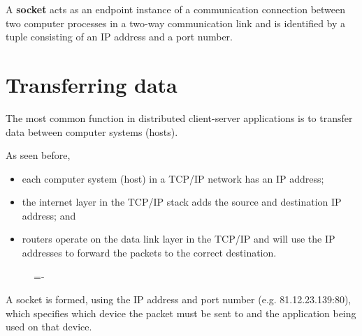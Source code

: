 \documentclass[a4paper]{systems-software}
\begin{document}
A \textbf{socket} acts as an endpoint instance of a communication connection between two computer processes in a two-way communication link and is identified by a tuple consisting of an IP address and a port number.


\section*{Transferring data}

The most common function in distributed client-server applications is to transfer data between computer systems (hosts).

As seen before,
\begin{itemize}
	\item each computer system (host) in a TCP/IP network has an IP address;
	\item the internet layer in the TCP/IP stack adds the source and destination IP address; and
	\item routers operate on the data link layer in the TCP/IP and will use the IP addresses to forward the packets to the correct destination.
\end{itemize}

\begin{figure}[H]
	\lineskip=-\fboxrule
\end{figure}

A socket is formed, using the IP address and port number (e.g. 81.12.23.139:80), which specifies which device the packet must be sent to and the application being used on that device.
\end{document}
